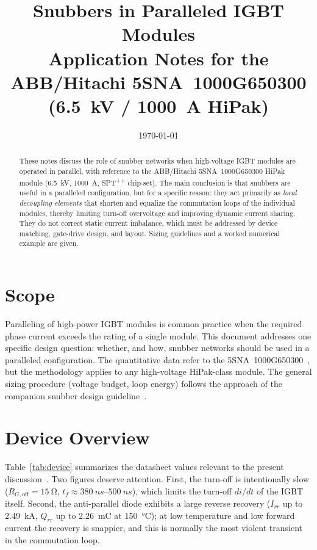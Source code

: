 \documentclass[11pt,a4paper]{article}
\title{Snubbers in Paralleled IGBT Modules\\
\large Application Notes for the ABB/Hitachi 5SNA~1000G650300 (\SI{6.5}{kV} / \SI{1000}{A} HiPak)}
\author{}
\date{\today}
\begin{document}
\maketitle

\begin{abstract}
These notes discuss the role of snubber networks when high-voltage IGBT modules are
operated in parallel, with reference to the ABB/Hitachi 5SNA~1000G650300 HiPak module
(\SI{6.5}{kV}, \SI{1000}{A}, SPT\textsuperscript{++} chip-set). The main conclusion is
that snubbers are useful in a paralleled configuration, but for a specific reason: they
act primarily as \emph{local decoupling elements} that shorten and equalize the
commutation loops of the individual modules, thereby limiting turn-off overvoltage and
improving dynamic current sharing. They do not correct static current imbalance, which
must be addressed by device matching, gate-drive design, and layout. Sizing guidelines
and a worked numerical example are given.
\end{abstract}

\section{Scope}
Paralleling of high-power IGBT modules is common practice when the required phase
current exceeds the rating of a single module. This document addresses one specific
design question: whether, and how, snubber networks should be used in a paralleled
configuration. The quantitative data refer to the 5SNA~1000G650300~\cite{ds}, but the
methodology applies to any high-voltage HiPak-class module. The general sizing
procedure (voltage budget, loop energy) follows the approach of the companion snubber
design guideline~\cite{snubnote}.

\section{Device Overview}
Table~\ref{tab:device} summarizes the datasheet values relevant to the present
discussion~\cite{ds}. Two figures deserve attention. First, the turn-off is
intentionally slow ($R_{G,\mathrm{off}}=\SI{15}{\ohm}$, $t_f \approx
\SIrange{380}{500}{ns}$), which limits the turn-off $di/dt$ of the IGBT itself. Second,
the anti-parallel diode exhibits a large reverse recovery ($I_{rr}$ up to
\SI{2.49}{kA}, $Q_{rr}$ up to \SI{2.26}{mC} at \SI{150}{\celsius}); at low temperature
and low forward current the recovery is snappier, and this is normally the most
violent transient in the commutation loop.
\end{document}
